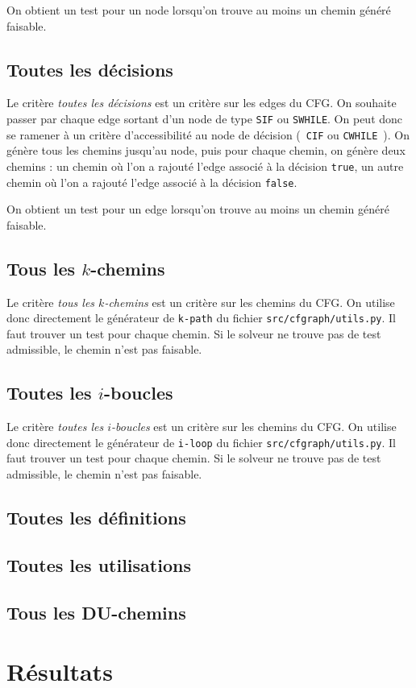 On obtient un test pour un node lorsqu'on trouve au moins un chemin généré
faisable.

\subsection{Toutes les décisions}

Le critère \textit{toutes les décisions} est un critère sur les edges du CFG.
On souhaite passer par chaque edge sortant d'un node de type \texttt{SIF} ou
\texttt{SWHILE}. On peut donc se ramener à un critère d'accessibilité au node
de décision (~\texttt{CIF} ou \texttt{CWHILE}~). On génère tous les chemins
jusqu'au node, puis pour chaque chemin, on génère deux chemins : un chemin où
l'on a rajouté l'edge associé à la décision \texttt{true}, un autre chemin où
l'on a rajouté l'edge associé à la décision \texttt{false}.

On obtient un test pour un edge lorsqu'on trouve au moins un chemin généré
faisable.

\subsection{Tous les $k$-chemins}

Le critère \textit{tous les $k$-chemins} est un critère sur les chemins du CFG.
On utilise donc directement le générateur de \texttt{k-path} du fichier
\texttt{src/cfgraph/utils.py}. Il faut trouver un test pour chaque chemin. Si
le solveur ne trouve pas de test admissible, le chemin n'est pas faisable.

\subsection{Toutes les $i$-boucles}

Le critère \textit{toutes les $i$-boucles} est un critère sur les chemins du CFG.
On utilise donc directement le générateur de \texttt{i-loop} du fichier
\texttt{src/cfgraph/utils.py}. Il faut trouver un test pour chaque chemin. Si
le solveur ne trouve pas de test admissible, le chemin n'est pas faisable.

\subsection{Toutes les définitions}

\subsection{Toutes les utilisations}

\subsection{Tous les DU-chemins}

\section{Résultats}

